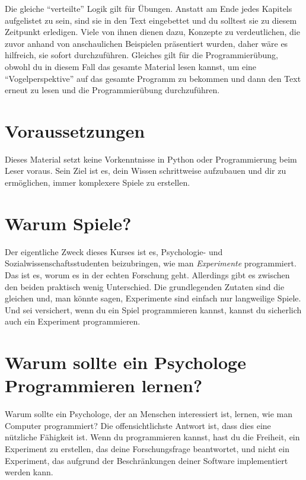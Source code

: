 \documentclass[
]{book}
\begin{document}
Die gleiche ``verteilte'' Logik gilt für Übungen. Anstatt am Ende jedes Kapitels aufgelistet zu sein, sind sie in den Text eingebettet und du solltest sie zu diesem Zeitpunkt erledigen. Viele von ihnen dienen dazu, Konzepte zu verdeutlichen, die zuvor anhand von anschaulichen Beispielen präsentiert wurden, daher wäre es hilfreich, sie sofort durchzuführen. Gleiches gilt für die Programmierübung, obwohl du in diesem Fall das gesamte Material lesen kannst, um eine ``Vogelperspektive'' auf das gesamte Programm zu bekommen und dann den Text erneut zu lesen und die Programmierübung durchzuführen.

\hypertarget{voraussetzungen}{%
\section{Voraussetzungen}\label{voraussetzungen}}

Dieses Material setzt keine Vorkenntnisse in Python oder Programmierung beim Leser voraus. Sein Ziel ist es, dein Wissen schrittweise aufzubauen und dir zu ermöglichen, immer komplexere Spiele zu erstellen.

\hypertarget{warum-spiele}{%
\section{Warum Spiele?}\label{warum-spiele}}

Der eigentliche Zweck dieses Kurses ist es, Psychologie- und Sozialwissenschaftsstudenten beizubringen, wie man \emph{Experimente} programmiert. Das ist es, worum es in der echten Forschung geht. Allerdings gibt es zwischen den beiden praktisch wenig Unterschied. Die grundlegenden Zutaten sind die gleichen und, man könnte sagen, Experimente sind einfach nur langweilige Spiele. Und sei versichert, wenn du ein Spiel programmieren kannst, kannst du sicherlich auch ein Experiment programmieren.

\hypertarget{warum-sollte-ein-psychologe-programmieren-lernen}{%
\section{Warum sollte ein Psychologe Programmieren lernen?}\label{warum-sollte-ein-psychologe-programmieren-lernen}}

Warum sollte ein Psychologe, der an Menschen interessiert ist, lernen, wie man Computer programmiert? Die offensichtlichste Antwort ist, dass dies eine nützliche Fähigkeit ist. Wenn du programmieren kannst, hast du die Freiheit, ein Experiment zu erstellen, das deine Forschungsfrage beantwortet, und nicht ein Experiment, das aufgrund der Beschränkungen deiner Software implementiert werden kann.
\end{document}
